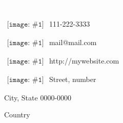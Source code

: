 
\newcommand{\ContactEntry}[2]{
	$\begin{array}{l}
	{\texttt{[image: \#1]}}
	\end{array}
	$ #2
}


\LARGE
\noindent\colorbox{materialGreen}
{\parbox[c][25pt][c]{\textwidth}{\hspace{15pt}\textcolor{white}{Contacts}}} %

\begin{multicols}{2}

\large
\ContactEntry{images/green/telephone1}{111-222-3333}

\ContactEntry{images/green/mail9}{mail@mail.com}

\ContactEntry{images/green/links1}{http://mywebsite.com}

\columnbreak

\ContactEntry{images/green/house3}{Street, number

\hspace*{25pt} City, State 0000-0000

\hspace*{25pt} Country}


\end{multicols}
